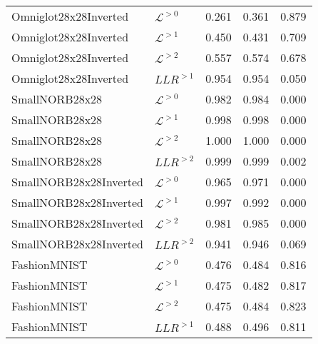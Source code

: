 {\begin{table}[t]
\begin{tabular}{llrrr}
\midrule
Omniglot28x28Inverted    &  $\mathcal{L}^{>0}$    &  0.261  &  0.361  &  0.879 \\
Omniglot28x28Inverted    &  $\mathcal{L}^{>1}$    &  0.450  &  0.431  &  0.709 \\
Omniglot28x28Inverted    &  $\mathcal{L}^{>2}$    &  0.557  &  0.574  &  0.678 \\
Omniglot28x28Inverted    &  $LLR^{>1}$            &  0.954  &  0.954  &  0.050 \\
\midrule
SmallNORB28x28           &  $\mathcal{L}^{>0}$    &  0.982  &  0.984  &  0.000 \\
SmallNORB28x28           &  $\mathcal{L}^{>1}$    &  0.998  &  0.998  &  0.000 \\
SmallNORB28x28           &  $\mathcal{L}^{>2}$    &  1.000  &  1.000  &  0.000 \\
SmallNORB28x28           &  $LLR^{>2}$            &  0.999  &  0.999  &  0.002 \\
\midrule
SmallNORB28x28Inverted   &  $\mathcal{L}^{>0}$    &  0.965  &  0.971  &  0.000 \\
SmallNORB28x28Inverted   &  $\mathcal{L}^{>1}$    &  0.997  &  0.992  &  0.000 \\
SmallNORB28x28Inverted   &  $\mathcal{L}^{>2}$    &  0.981  &  0.985  &  0.000 \\
SmallNORB28x28Inverted   &  $LLR^{>2}$            &  0.941  &  0.946  &  0.069 \\
\midrule
FashionMNIST             &  $\mathcal{L}^{>0}$    &  0.476  &  0.484  &  0.816 \\
FashionMNIST             &  $\mathcal{L}^{>1}$    &  0.475  &  0.482  &  0.817 \\
FashionMNIST             &  $\mathcal{L}^{>2}$    &  0.475  &  0.484  &  0.823 \\
FashionMNIST             &  $LLR^{>1}$            &  0.488  &  0.496  &  0.811 \\
         \bottomrule
    \end{tabular}
    \label{tab_hierarchical:additional-results-fashionmnist}
\end{table}

}
